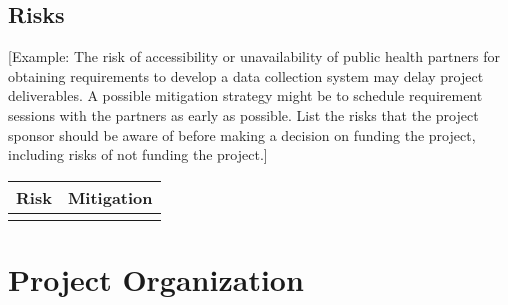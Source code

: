 \documentclass[11pt]{article}
\begin{document}
\subsection{Risks}
\label{sec:org71c0f44}
[Example: The risk of accessibility or unavailability of public health partners for obtaining requirements to develop a data collection system may delay project deliverables. A possible mitigation strategy might be to schedule requirement sessions with the partners as early as possible. List the risks that the project sponsor should be aware of before making a decision on funding the project, including risks of not funding the project.]
\begin{center}
\begin{tabular}{ll}
Risk & Mitigation\\
\hline
 & \\
\end{tabular}
\end{center}

\section{Project Organization}
\label{sec:org333f546}
\end{document}
